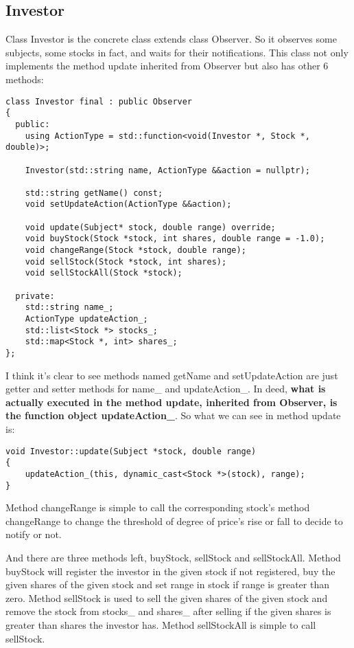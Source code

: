 \documentclass{article}
\begin{document}
\subsection{Investor}

    Class Investor is the concrete class extends class Observer. So it observes some subjects, some stocks in fact, and waits for their notifications. This class not only implements the method update inherited from Observer but also has other 6 methods:
    
\begin{lstlisting}
class Investor final : public Observer
{
  public:
    using ActionType = std::function<void(Investor *, Stock *, double)>;

    Investor(std::string name, ActionType &&action = nullptr);

    std::string getName() const;
    void setUpdateAction(ActionType &&action);
    
    void update(Subject* stock, double range) override;
    void buyStock(Stock *stock, int shares, double range = -1.0);
    void changeRange(Stock *stock, double range);
    void sellStock(Stock *stock, int shares);
    void sellStockAll(Stock *stock);

  private:
    std::string name_;
    ActionType updateAction_;
    std::list<Stock *> stocks_;
    std::map<Stock *, int> shares_;
};
\end{lstlisting}

    I think it's clear to see methods named getName and setUpdateAction are just getter and setter methods for name\_ and updateAction\_. In deed, \textbf{what is actually executed in the method update, inherited from Observer, is the function object updateAction\_}. So what we can see in method update is:
    
\begin{lstlisting}
void Investor::update(Subject *stock, double range)
{
    updateAction_(this, dynamic_cast<Stock *>(stock), range);
}
\end{lstlisting}
    
    Method changeRange is simple to call the corresponding stock's method changeRange to change the threshold of degree of price's rise or fall to decide to notify or not.
    
    And there are three methods left, buyStock, sellStock and sellStockAll. Method buyStock will register the investor in the given stock if not registered, buy the given shares of the given stock and set range in stock if range is greater than zero. Method sellStock is used to sell the given shares of the given stock and remove the stock from stocks\_ and shares\_ after selling if the given shares is greater than shares the investor has. Method sellStockAll is simple to call sellStock.
\end{document}
